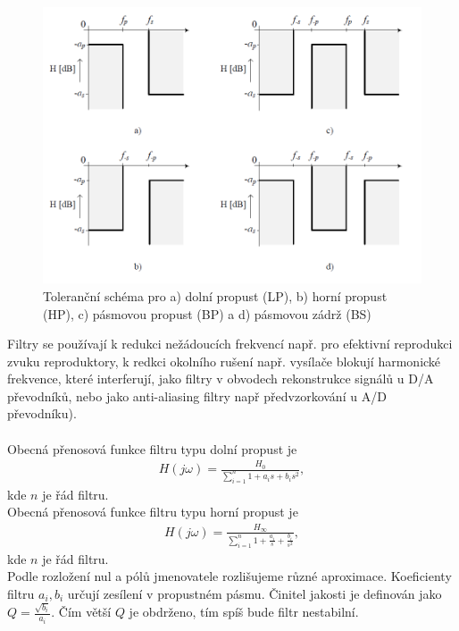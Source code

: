 \documentclass[twoside]{article}
\begin{document}
\begin{figure}[H]
\centering
\includegraphics[scale=0.55]{tolerancnischemata.png}
\caption{Toleranční schéma pro a) dolní propust (LP), b) horní propust (HP), c) pásmovou propust (BP) a d) pásmovou zádrž (BS)\cite{1}}
\end{figure}
\noindent Filtry se používají k redukci nežádoucích frekvencí např. pro efektivní reprodukci zvuku reproduktory, k redkci okolního rušení např. vysílače blokují harmonické frekvence, které interferují, jako filtry v obvodech rekonstrukce signálů u D/A převodníků, nebo jako anti-aliasing filtry např předvzorkování u A/D převodníku).\\\\
Obecná přenosová funkce filtru typu dolní propust je
\begin{align}
H(j\omega) = \frac{H_0}{\sum_{i=1}^{n} 1 + a_i s + b_i s^2},
\end{align}
kde $n$ je řád filtru.\\
Obecná přenosová funkce filtru typu horní propust je
\begin{align}
H(j\omega) = \frac{H_{\infty}}{\sum_{i=1}^{n} 1 + \frac{a_i}{s} + \frac{b_i}{s^2}},
\end{align}
kde $n$ je řád filtru.\\
Podle rozložení nul a pólů jmenovatele rozlišujeme různé aproximace. Koeficienty filtru $a_i, b_i$ určují zesílení v propustném pásmu. Činitel jakosti je definován jako $Q = \frac{\sqrt{b_i}}{a_i}$. Čím větší $Q$ je obdrženo, tím spíš bude filtr nestabilní.
\end{document}
